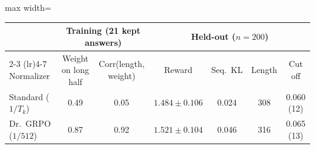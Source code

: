 \begin{adjustbox}{max width=\linewidth}
\begin{tabular}{lcccccc}
\toprule
 & \multicolumn{2}{c}{Training (21 kept answers)} & \multicolumn{4}{c}{Held-out ($n = 200$)} \\
\cmidrule(lr){2-3} \cmidrule(lr){4-7}
Normalizer & Weight on long half & Corr(length, weight) & Reward & Seq.\ KL & Length & Cut off \\
\midrule
Standard ($1/T_k$) & 0.49 & 0.05 & $1.484 \pm 0.106$ & 0.024 & 308 & 0.060 (12) \\
Dr.~GRPO ($1/512$) & 0.87 & 0.92 & $1.521 \pm 0.104$ & 0.046 & 316 & 0.065 (13) \\
\bottomrule
\end{tabular}
\end{adjustbox}
